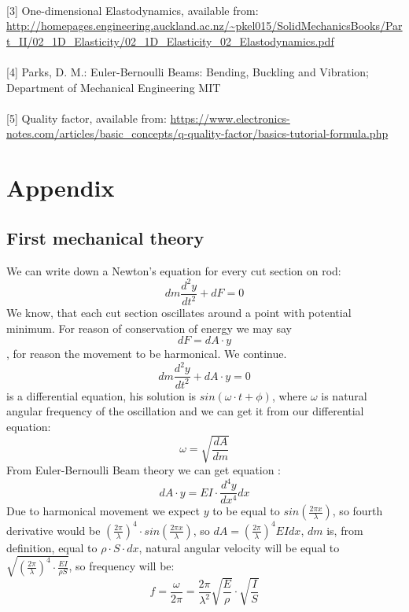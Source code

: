 \documentclass[10pt,a4paper]{article}
\begin{document}
\paragraph{}[3] One-dimensional Elastodynamics, available from: \url{http://homepages.engineering.auckland.ac.nz/~pkel015/SolidMechanicsBooks/Part_II/02_1D_Elasticity/02_1D_Elasticity_02_Elastodynamics.pdf}
\paragraph{}[4] Parks, D. M.: Euler-Bernoulli Beams: Bending, Buckling and Vibration; Department of Mechanical Engineering MIT
\paragraph{}[5] Quality factor, available from: \url{https://www.electronics-notes.com/articles/basic_concepts/q-quality-factor/basics-tutorial-formula.php }

\newpage

\section{Appendix}
\subsection{First mechanical theory}
We can write down a Newton’s equation for every cut section on rod:
$$dm\frac{d^{2}y}{dt^{2}}+dF=0$$
We know, that each cut section oscillates around a point with potential minimum. For reason of conservation of energy we may say $$dF = dA \cdot y$$, for reason the movement to be harmonical. We continue.
$$dm\frac{d^{2}y}{dt^{2}}+ dA \cdot y=0$$
is a differential equation, his solution is $ sin(\omega \cdot t + \phi) $, where $ \omega $ is natural angular frequency of the oscillation and we can get it from our differential equation:
$$\omega=\sqrt{\frac{dA}{dm}}$$
From Euler-Bernoulli Beam theory we can get equation :
$$dA \cdot y =EI\cdot \frac{d^{4}y}{dx^{4}}dx$$
Due to harmonical movement we expect $y$ to be equal to $sin(\frac{2 \pi x}{\lambda})$, so fourth derivative would be $(\frac{2 \pi}{\lambda})^{4} \cdot sin(\frac{2 \pi x}{\lambda})$, so $dA=(\frac{2 \pi}{\lambda})^{4}EIdx$, $dm$ is, from definition, equal to $\rho \cdot S \cdot dx$, natural angular velocity will be equal to $ \sqrt{(\frac{2 \pi}{\lambda})^{4}\cdot \frac{EI}{\rho S}} $, so frequency will be: $$f = \frac{\omega}{2\pi} = \frac{2 \pi}{\lambda^{2}} \sqrt{\frac{E}{\rho}} \cdot \sqrt{\frac{I}{S}}$$
\end{document}
